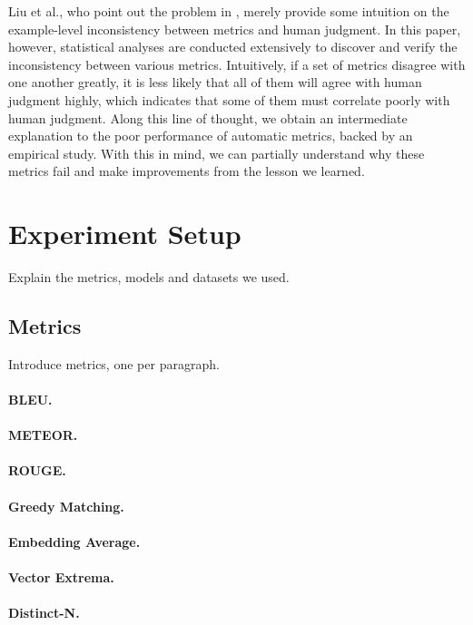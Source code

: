 \documentclass[runningheads]{llncs}
\begin{document}
    Liu et al., who point out the problem in \cite{HowNot}, merely provide some intuition on the example-level inconsistency between metrics and human judgment. In this paper, however, statistical analyses are conducted extensively to discover and verify the inconsistency between various metrics. Intuitively, if a set of metrics disagree with one another greatly, it is less likely that all of them will agree with human judgment highly, which indicates that some of them must correlate poorly with human judgment. Along this line of thought, we obtain an intermediate explanation to the poor performance of automatic metrics, backed by an empirical study. With this in mind, we can partially understand why these metrics fail and make improvements from the lesson we learned.

    \section{Experiment Setup}
    Explain the metrics, models and datasets we used.

    \subsection{Metrics}
    Introduce metrics, one per paragraph.
    \paragraph{BLEU.}
    \paragraph{METEOR.}
    \paragraph{ROUGE.}

    \paragraph{Greedy Matching.}
    \paragraph{Embedding Average.}
    \paragraph{Vector Extrema.}

    \paragraph{Distinct-N.}
\end{document}
